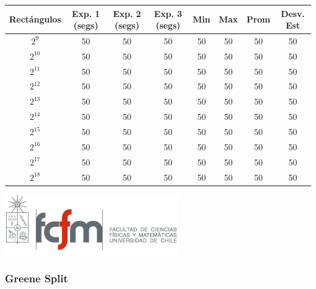 \documentclass[letterpaper,10pt]{article}
\begin{document}
	\begin{center}

		\begin{tabular}{|c|c|c|c|c|c|c|c|}
			\hline
			Rectángulos	& Exp. 1 (segs) & Exp. 2 (segs) & Exp. 3 (segs) & Min & Max & Prom & Desv. Est\\
			\hline
			$2^{9}$ 	& 50 	& 50 	& 50 	& 50 	& 50 	& 50 	& 50 \\
			\hline
			$2^{10}$ 	& 50 	& 50 	& 50 	& 50 	& 50 	& 50 	& 50 \\
			\hline
			$2^{11}$ 	& 50 	& 50 	& 50 	& 50 	& 50 	& 50 	& 50 \\
			\hline
			$2^{12}$ 	& 50 	& 50 	& 50 	& 50 	& 50 	& 50 	& 50 \\
			\hline
			$2^{13}$ 	& 50 	& 50 	& 50 	& 50 	& 50 	& 50 	& 50 \\
			\hline
			$2^{14}$ 	& 50 	& 50 	& 50 	& 50 	& 50 	& 50 	& 50 \\
			\hline
			$2^{15}$ 	& 50 	& 50 	& 50 	& 50 	& 50 	& 50 	& 50 \\
			\hline
			$2^{16}$ 	& 50 	& 50 	& 50 	& 50 	& 50 	& 50 	& 50 \\
			\hline
			$2^{17}$ 	& 50 	& 50 	& 50 	& 50 	& 50 	& 50 	& 50 \\
			\hline
			$2^{18}$ 	& 50 	& 50 	& 50 	& 50 	& 50 	& 50 	& 50 \\
			\hline
		\end{tabular}

		\includegraphics{logoFCFM.png}
	\end{center}

	\subsubsection{Greene Split}
\end{document}
